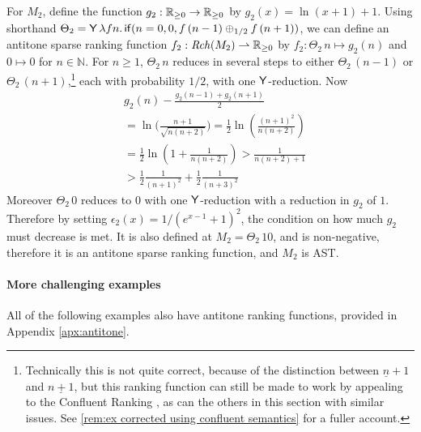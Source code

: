 \begin{example}
\label{ex:unbiased random walk}
For $M_2$, define the function $g_2 : \mathbb{R}_{{\geq}0} \to \mathbb{R}_{{\geq}0}$ by $g_2(x) = \ln(x+1) + 1$.
Using shorthand 
$\Theta_2 = \mathsf{Y} \, \lambda f n . \, 
\mathsf{if}(n = 0, 0, f \, (n - 1) \oplus_{1/2} f \, (n + 1))$, 
we can define an antitone sparse ranking function $f_2 : \mathit{Rch}(M_2) \rightharpoonup \mathbb{R}_{{\geq}0}$ 
by
\(
f_2: {\Theta_2} \, n \mapsto 
g_2(n)
\)
and
$0 \mapsto 0$
for $n \in \mathbb N$.
For $n \geq 1$, $\Theta_2 \, n$ reduces in several steps to either $\Theta_2 \, (n-1)$ or $\Theta_2 \, (n+1)$,\footnote{Technically this is not quite correct, because of the distinction between $\underline n + 1$ and $\underline{n + 1}$, but this ranking function can still be made to work by appealing to the Confluent Ranking , as can the others in this section with similar issues. See \cref{rem:ex corrected using confluent semantics} for a fuller account.} each with probability $1/2$, with one $\mathsf{Y}$-reduction.
Now
\begin{align*}%
& g_2(n) - \frac{g_2(n-1) + g_2(n+1)} 2 \\
  &=  \ln \Big(\frac{n+1}{\sqrt{n(n+2)}}\Big) 
  =  \frac 1 2 \ln\left(\frac{(n+1)^2}{n(n+2)}\right) \\
  &=  \frac 1 2 \ln\left(1 + \frac 1 {n(n+2)}\right) 
  >  \frac 1 {n(n+2) + 1} \\
  &>  \frac 1 2 \frac 1 {(n+1)^2} + \frac 1 2 \frac 1 {(n+3)^2}
\end{align*}
Moreover $\Theta_2 \, 0$ reduces to $0$ with one $\mathsf{Y}$-reduction with a reduction in $g_2$ of $1$.
Therefore by setting $\epsilon_2(x) = 1 / {(e^{x-1}+1)^2}$, the condition on how much $g_2$ must decrease is met. It is also defined at $M_2 = \Theta_2 \, 10$, and is non-negative, therefore it is an antitone sparse ranking function, and $M_2$ is AST.
\end{example}

\paragraph*{More challenging examples} All of the following examples also have antitone ranking functions, provided in Appendix \ref{apx:antitone}.

